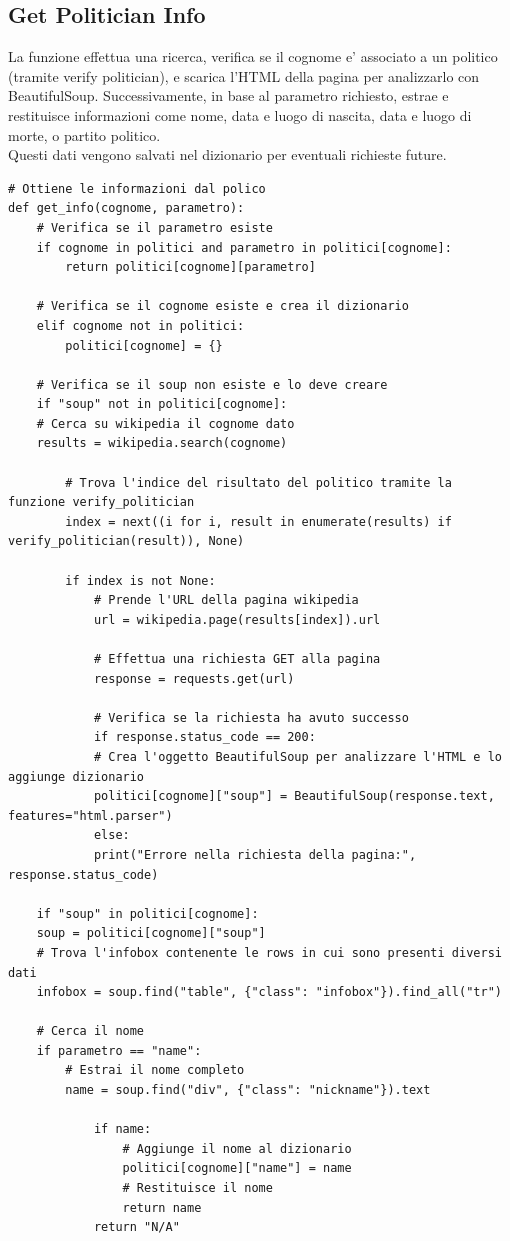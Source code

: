 \documentclass{article}
\begin{document}
		\subsection{Get Politician Info}
La funzione effettua una ricerca, verifica se il cognome e' associato a un politico (tramite verify politician), e scarica l'HTML della pagina per analizzarlo con BeautifulSoup.
Successivamente, in base al parametro richiesto, estrae e restituisce informazioni come nome, data e luogo di nascita, data e luogo di morte, o partito politico. \\ Questi dati vengono salvati nel dizionario per eventuali richieste future.
		\begin{lstlisting}
# Ottiene le informazioni dal polico
def get_info(cognome, parametro):
	# Verifica se il parametro esiste 
	if cognome in politici and parametro in politici[cognome]:
		return politici[cognome][parametro]

	# Verifica se il cognome esiste e crea il dizionario
	elif cognome not in politici:
		politici[cognome] = {}

	# Verifica se il soup non esiste e lo deve creare
	if "soup" not in politici[cognome]:
	# Cerca su wikipedia il cognome dato
	results = wikipedia.search(cognome)

		# Trova l'indice del risultato del politico tramite la funzione verify_politician
		index = next((i for i, result in enumerate(results) if verify_politician(result)), None)

		if index is not None:
			# Prende l'URL della pagina wikipedia
			url = wikipedia.page(results[index]).url

			# Effettua una richiesta GET alla pagina
			response = requests.get(url)
			
			# Verifica se la richiesta ha avuto successo
			if response.status_code == 200:
			# Crea l'oggetto BeautifulSoup per analizzare l'HTML e lo aggiunge dizionario
			politici[cognome]["soup"] = BeautifulSoup(response.text, features="html.parser")
			else:
			print("Errore nella richiesta della pagina:", response.status_code)

	if "soup" in politici[cognome]:
	soup = politici[cognome]["soup"]
	# Trova l'infobox contenente le rows in cui sono presenti diversi dati
	infobox = soup.find("table", {"class": "infobox"}).find_all("tr")
	
	# Cerca il nome
	if parametro == "name":
		# Estrai il nome completo
		name = soup.find("div", {"class": "nickname"}).text

			if name:
				# Aggiunge il nome al dizionario
				politici[cognome]["name"] = name
				# Restituisce il nome
				return name
			return "N/A"


\end{lstlisting}
\end{document}
